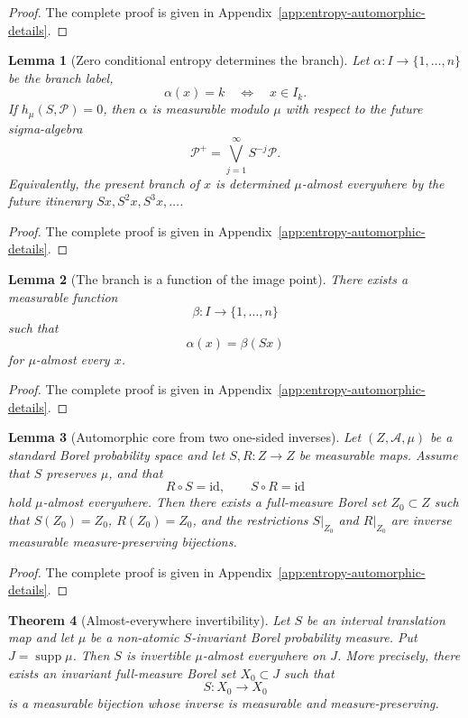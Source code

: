 \documentclass[11pt]{amsart}
\theoremstyle{plain}
\newtheorem{theorem}{Theorem}[section]
\newtheorem{lemma}[theorem]{Lemma}
\theoremstyle{definition}
\theoremstyle{remark}
\DeclareMathOperator{\supp}{supp}
\newcommand{\cP}{\mathcal P}
\begin{document}
\begin{proof}
The complete proof is given in Appendix~\ref{app:entropy-automorphic-details}.
\end{proof}

\begin{lemma}[Zero conditional entropy determines the branch]\label{lem:branch-future}
Let $\alpha:I\to\{1,\ldots,n\}$ be the branch label,
\[
        \alpha(x)=k\quad\Longleftrightarrow\quad x\in I_k.
\]
If $h_\mu(S,\cP)=0$, then $\alpha$ is measurable modulo $\mu$ with respect to the future sigma-algebra
\[
        \cP^+=\bigvee_{j=1}^{\infty}S^{-j}\cP.
\]
Equivalently, the present branch of $x$ is determined $\mu$-almost everywhere by the future itinerary $Sx,S^2x,S^3x,\ldots$.
\end{lemma}

\begin{proof}
The complete proof is given in Appendix~\ref{app:entropy-automorphic-details}.
\end{proof}

\begin{lemma}[The branch is a function of the image point]\label{lem:branch-image}
There exists a measurable function
\[
        \beta:I\to\{1,\ldots,n\}
\]
such that
\[
        \alpha(x)=\beta(Sx)
\]
for $\mu$-almost every $x$.
\end{lemma}

\begin{proof}
The complete proof is given in Appendix~\ref{app:entropy-automorphic-details}.
\end{proof}


\begin{lemma}[Automorphic core from two one-sided inverses]\label{lem:automorphic-core}
Let \((Z,\mathcal A,\mu)\) be a standard Borel probability space and let
\(S,R:Z\to Z\) be measurable maps. Assume that \(S\) preserves \(\mu\), and that
\[
        R\circ S=\mathrm{id},\qquad S\circ R=\mathrm{id}
\]
hold \(\mu\)-almost everywhere. Then there exists a full-measure Borel set
\(Z_0\subset Z\) such that \(S(Z_0)=Z_0\), \(R(Z_0)=Z_0\), and the restrictions
\(S|_{Z_0}\) and \(R|_{Z_0}\) are inverse measurable measure-preserving bijections.
\end{lemma}

\begin{proof}
The complete proof is given in Appendix~\ref{app:entropy-automorphic-details}.
\end{proof}

\begin{theorem}[Almost-everywhere invertibility]\label{thm:ae-invertible}
Let $S$ be an interval translation map and let $\mu$ be a non-atomic $S$-invariant Borel probability measure. Put $J=\supp\mu$. Then $S$ is invertible $\mu$-almost everywhere on $J$. More precisely, there exists an invariant full-measure Borel set $X_0\subset J$ such that
\[
        S:X_0\to X_0
\]
is a measurable bijection whose inverse is measurable and measure-preserving.
\end{theorem}
\end{document}
